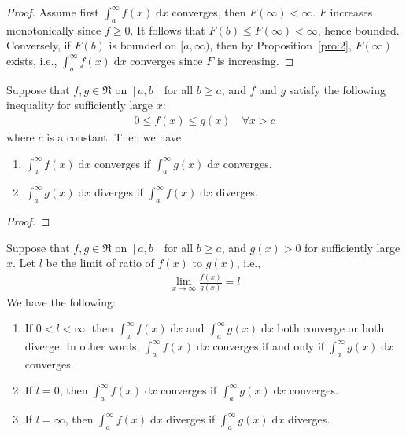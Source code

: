 \documentclass[thmcnt=section, 12pt]{elegantbook}
\begin{document}
\begin{proof}
    Assume first $\int_a^\infty f(x) \; \mathrm{d}x$ converges, then $F(\infty) < \infty$. $F$ increases monotonically since $f \geq 0$. It follows that $F(b) \leq F(\infty) < \infty$, hence bounded. Conversely, if $F(b)$ is bounded on $[a, \infty)$, then by Proposition~\ref{pro:2}, $F(\infty)$ exists, i.e., $\int_a^\infty f(x) \; \mathrm{d}x$ converges since $F$ is increasing.
\end{proof}


\begin{theorem} \label{thm:25}
    Suppose that $f, g \in \mathfrak{R}$ on $[a, b]$ for all $b \geq a$, and $f$ and $g$ satisfy the following inequality for sufficiently large $x$:
    \begin{align*}
        0 \leq f(x) \leq g(x)
        \quad \forall x > c
    \end{align*}
    where $c$ is a constant. Then we have 
    \begin{enumerate}
        \item $\int_a^\infty f(x) \; \mathrm{d}x$ converges if $\int_a^\infty g(x) \; \mathrm{d}x$ converges.
        \item $\int_a^\infty g(x) \; \mathrm{d}x$ diverges if $\int_a^\infty f(x) \; \mathrm{d}x$ diverges.
    \end{enumerate}
\end{theorem}

\begin{proof}
\end{proof}


\begin{theorem}
    Suppose that $f, g \in \mathfrak{R}$ on $[a, b]$ for all $b \geq a$, and $g(x) > 0$ for sufficiently large $x$. Let $l$ be the limit of ratio of $f(x)$ to $g(x)$, i.e., 
    \begin{align*}
        \lim_{x \to \infty} \frac{f(x)}{g(x)} = l
    \end{align*}
    We have the following:
    \begin{enumerate}
        \item If $0 < l < \infty$, then $\int_a^\infty f(x) \; \mathrm{d}x$ and $\int_a^\infty g(x) \; \mathrm{d}x$ both converge or both diverge. In other words, $\int_a^\infty f(x) \; \mathrm{d}x$ converges if and only if $\int_a^\infty g(x) \; \mathrm{d}x$ converges.
        \item If $l = 0$, then $\int_a^\infty f(x) \; \mathrm{d}x$ converges if $\int_a^\infty g(x) \; \mathrm{d}x$ converges.
        \item If $l = \infty$, then $\int_a^\infty f(x) \; \mathrm{d}x$ diverges if $\int_a^\infty g(x) \; \mathrm{d}x$ diverges.
    \end{enumerate}
\end{theorem}
\end{document}
